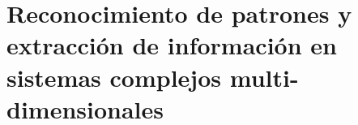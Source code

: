 \chapter{Reconocimiento de patrones y extracción de información en sistemas complejos multi-dimensionales}

\ifpdf
    \graphicspath{{Chapter6/Figs/Raster/}{Chapter6/Figs/PDF/}{Chapter6/Figs/}}
\else
    \graphicspath{{Chapter6/Figs/Vector/}{Chapter6/Figs/}}
\fi
